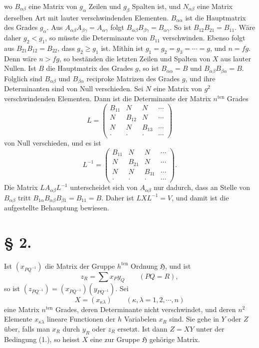 \documentclass[11pt]{article}
\newcommand{\Hgr}{\mathfrak{H}}
\newcommand{\ten}{\mathrm{ten}}
\begin{document}
wo $B_{\alpha\beta}$ eine Matrix von $g_\alpha$ Zeilen und $g_\beta$ Spalten ist, und $N_{\alpha\beta}$ eine Matrix derselben Art mit lauter verschwindenden Elementen. $B_{\alpha\alpha}$ ist die Hauptmatrix des Grades $g_\alpha$. Aus $A_{\alpha\beta}A_{\beta\gamma}=A_{\alpha\gamma}$ folgt $B_{\alpha\beta}B_{\beta\gamma}=B_{\alpha\gamma}$. So ist $B_{12}B_{21}=B_{11}$. Wäre daher $g_2<g_1$, so müsste die Determinante von $B_{11}$ verschwinden. Ebenso folgt aus $B_{21}B_{12}=B_{22}$, dass $g_2\geq g_1$ ist. Mithin ist $g_1=g_2=g_3=\cdots=g$, und $n=fg$. Denn wäre $n>fg$, so beständen die letzten Zeilen und Spalten von $X$ aus lauter Nullen. Ist $B$ die Hauptmatrix des Grades $g$, so ist $B_{\alpha\alpha}=B$ und $B_{\alpha\beta}B_{\beta\alpha}=B$. Folglich sind $B_{\alpha\beta}$ und $B_{\beta\alpha}$ reciproke Matrizen des Grades $g$, und ihre Determinanten sind von Null verschieden. Sei $N$ eine Matrix von $g^2$ verschwindenden Elementen. Dann ist die Determinante der Matrix $n^{\ten}$ Grades
\[
L=\begin{pmatrix}
B_{11}&N&N&\cdots\\
N&B_{12}&N&\cdots\\
N&N&B_{13}&\cdots\\
\cdot&\cdot&\cdot&\cdots
\end{pmatrix}
\]
von Null verschieden, und es ist
\[
L^{-1}=\begin{pmatrix}
B_{11}&N&N&\cdots\\
N&B_{21}&N&\cdots\\
N&N&B_{31}&\cdots\\
\cdot&\cdot&\cdot&\cdots
\end{pmatrix}.
\]
Die Matrix $LA_{\alpha\beta}L^{-1}$ unterscheidet sich von $A_{\alpha\beta}$ nur dadurch, dass an Stelle von $B_{\alpha\beta}$ tritt $B_{1\alpha}B_{\alpha\beta}B_{\beta1}=B_{11}=B$. Daher ist $LXL^{-1}=V$, und damit ist die aufgestellte Behauptung bewiesen.

\section*{§ 2.}

Ist $(x_{PQ^{-1}})$ die Matrix der Gruppe $h^{\ten}$ Ordnung $\Hgr$, und ist
\begin{equation}\tag{1.}
z_R=\sum x_Py_Q\qquad(PQ=R),
\end{equation}
so ist $(z_{PQ^{-1}})=(x_{PQ^{-1}})(y_{PQ^{-1}})$. Sei
\[
X=(x_{\kappa\lambda})\qquad(\kappa,\lambda=1,2,\cdots,n)
\]
eine Matrix $n^{\ten}$ Grades, deren Determinante nicht verschwindet, und deren $n^2$ Elemente $x_{\kappa\lambda}$ lineare Functionen der $h$ Variabelen $x_R$ sind. Sie gehe in $Y$ oder $Z$ über, falls man $x_R$ durch $y_R$ oder $z_R$ ersetzt. Ist dann $Z=XY$ unter der Bedingung (1.), so heisst $X$ eine zur Gruppe $\Hgr$ gehörige Matrix.
\end{document}
